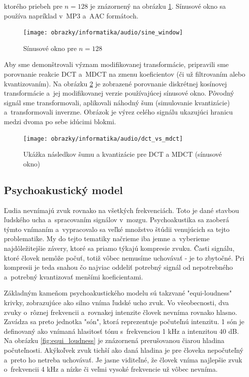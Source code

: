 ktorého priebeh pre $n=128$ je znázornený na obrázku
\ref{fig:sine_window}. Sínusové okno sa používa napríklad v~MP3 a~AAC
formátoch.

\begin{figure}[htp]
    \centering
    \texttt{[image: obrazky/informatika/audio/sine\_window]}
    \caption{Sínusové okno pre $n=128$}
    \label{fig:sine_window}
\end{figure}

Aby sme demonštrovali význam modifikovanej transformácie, pripravili
sme porovnanie reakcie DCT a~MDCT na zmenu koeficientov (či už
filtrovaním alebo kvantizovaním).
Na obrázku \ref{fig:dct_vs_mdct} je zobrazené porovnanie diskrétnej
kosínovej transformácie a~jej modifikovanej verzie používajúcej
sínusové okno.
Pôvodný signál sme transformovali, aplikovali náhodný šum (simulovanie
kvantizácie) a~transformovali inverzne. Obrázok je výrez celého
signálu ukazujúci hranicu medzi dvoma po sebe idúcimi blokmi.
\begin{figure}[htp]
    \centering
    \texttt{[image: obrazky/informatika/audio/dct\_vs\_mdct]}
    \caption{Ukážka následkov šumu a kvantizácie pre DCT a MDCT (sínusové okno)}
    \label{fig:dct_vs_mdct}
\end{figure}

\subsection{Psychoakustický model}
Ľudia nevnímajú zvuk rovnako na všetkých frekvenciách. Toto je dané
stavbou ľudského ucha a~spracovaním signálov v~mozgu. Psychoakustika
sa zaoberá týmto vnímaním a~vypracovalo sa veľké množstvo štúdii
venujúcich sa tejto problematike. My do tejto tematiky načrieme iba jemne
a~vyberieme najdôležitejšie závery, ktoré sa priamo týkajú
kompresie zvuku. Časti signálu, ktoré človek nemôže počuť, totiž vôbec
nemusíme uchovávať - je to zbytočné. Pri kompresii je teda snahou čo
najviac oddeliť potrebný signál od nepotrebného a~potrebný kvantizovať
menšími koeficientami.

Základným kameňom psychoakustického modelu sú takzvané "equi-loudness"
krivky, zobrazujúce ako silno vníma ľudské ucho zvuk. Vo všeobecnosti,
dva zvuky o~rôznej frekvencii a~rovnakej intenzite človek nevníma 
rovnako hlasno.
Zavádza sa preto jednotka "són", ktorá reprezentuje počuteľnú
intenzitu. 1 són je definovaný ako vnímaná hlasitosť tónu s~frekvenciou
1 kHz a intenzitou 40 dB. Na obrázku \ref{fig:equi_loudness} je
znázornená prerušovanou čiarou hladina počuteľnosti. Akýkoľvek zvuk
tichší ako daná hladina je pre človeka nepočuteľný a~preto ho netreba
uchovávať. Je jasne viditeľné, že človek vníma najlepšie zvuk 
o~frekvencii 4 kHz a nízke či veľmi vysoké frekvencie už vôbec nevníma.


